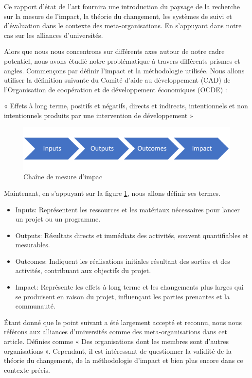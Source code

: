 Ce rapport d'état de l'art fournira une introduction du paysage de la recherche sur la mesure de l'impact, la théorie du changement, les systèmes de suivi et d'évaluation dans le contexte des meta-organisations. En s'appuyant dans notre cas sur les alliances d'universités. 

Alors que nous nous concentrons sur différents axes autour de notre cadre potentiel, nous avons étudié notre problématique à travers différents prismes et angles. 
Commençons par définir l'impact et la méthodologie utilisée. Nous allons utiliser la définition suivante du Comité d'aide au développement (CAD) de l'Organisation de coopération et de développement économiques (OCDE) :

« Effets à long terme, positifs et négatifs, directs et indirects, intentionnels et non intentionnels produits par une intervention de développement »\cite{oecd_quality_2010}

\begin{figure}
    \centering
    \includegraphics[width=1\linewidth]{Modele_Latex_CNRIUT2025//images/impact-chain.png}
    \caption{Chaîne de mesure d’impac\cite{stein_understanding_2012}}
    \label{fig:impact-chain}
\end{figure}
Maintenant, en s'appuyant sur la figure \ref{fig:impact-chain}, nous allons définir ses termes.
\begin{itemize}
    \item Inputs: Représentent les ressources et les matériaux nécessaires pour lancer un projet ou un programme.
    \item Outputs: Résultats directs et immédiats des activités, souvent quantifiables et mesurables.
    \item Outcomes: Indiquent les réalisations initiales résultant des sorties et des activités, contribuant aux objectifs du projet.
    \item Impact: Représente les effets à long terme et les changements plus larges qui se produisent en raison du projet, influençant les parties prenantes et la communauté.
\end{itemize}

Étant donné que le point suivant a été largement accepté et reconnu, nous nous référons aux alliances d'universités comme des meta-organisations dans cet article. Définies comme « Des organisations dont les membres sont d'autres organisations »\cite{ahrne_organizations_2005}. Cependant, il est intéressant de questionner la validité de la théorie du changement, de la méthodologie d'impact et bien plus encore dans ce contexte précis.

